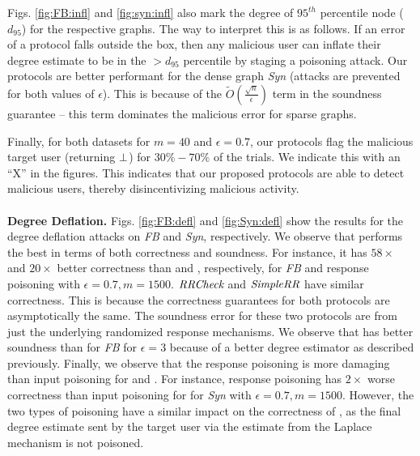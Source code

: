 \par Figs. \ref{fig:FB:infl} and \ref{fig:syn:infl} also mark the degree of $95^{th}$ percentile node ($d_{95}$) for the respective graphs. The way to interpret this is as follows.  If an error of a protocol falls outside the box, then any malicious user can inflate their degree estimate to be in the $>d_{95}$ percentile by staging a poisoning attack. Our protocols are better performant for the dense graph \textit{Syn} (attacks are prevented for both values of $\epsilon$). This is because of the $\tilde{O}(\frac{\sqrt{n}}{\epsilon})$ term in the soundness guarantee -- this term dominates the malicious error for sparse graphs. 

\par Finally, for both datasets for $m=40$ and $\epsilon = 0.7$, our protocols flag the malicious target user (returning $\perp$) for $30\%-70\%$ of the trials.  We indicate this with an ``X'' in the figures. This indicates that our proposed protocols are able to detect malicious users, thereby disincentivizing malicious activity.
\vspace{-0.2cm}\\\\
\noindent\textbf{Degree Deflation.}
Figs. \ref{fig:FB:defl} and  \ref{fig:Syn:defl} show the results for the degree deflation attacks on  \textit{FB} and \textit{Syn}, respectively. We observe that \DegHybrid{} performs the best in terms of both correctness and soundness. For instance, it has $58\times$ and $20\times$ better correctness than \DegRRNaive{} and \DegRRCheck{}, respectively, for \textit{FB} and response poisoning with $\epsilon=0.7, m=1500$. $\textit{RRCheck}{}$ and $\textit{SimpleRR}{}$ have similar correctness. This is because the correctness guarantees for both protocols are asymptotically the same. %
The soundness error for these two protocols are from just the underlying randomized response mechanisms. We observe that \DegRRCheck{} has better soundness than  \DegRRNaive{} for \textit{FB} for $\epsilon=3$ because of a better degree estimator as described previously. Finally, we observe that the response poisoning is more damaging than input poisoning for \DegRRNaive{} and \DegRRCheck. For instance, response poisoning has $2\times$ worse correctness than input poisoning for \DegRRCheck{} for \textit{Syn} with $\epsilon=0.7,m=1500$. However, the two types of poisoning have a similar impact on the correctness of \DegHybrid{}, as the final degree estimate sent by the target user via the estimate from the Laplace mechanism is not poisoned.

